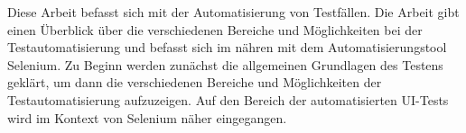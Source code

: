 \label{sec:zusammenfassung}
Diese Arbeit befasst sich mit der Automatisierung von Testfällen. Die Arbeit gibt einen Überblick über die verschiedenen Bereiche und Möglichkeiten bei der Testautomatisierung und befasst sich im nähren mit dem Automatisierungstool Selenium.
Zu Beginn werden zunächst die allgemeinen Grundlagen des Testens geklärt, um
dann die verschiedenen Bereiche und Möglichkeiten der Testautomatisierung aufzuzeigen. Auf den Bereich der automatisierten UI-Tests wird im Kontext von Selenium näher eingegangen.

